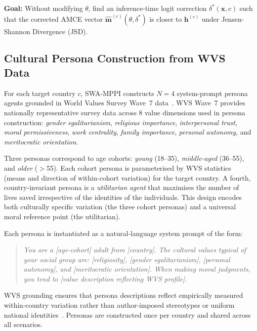 \documentclass{article}
\begin{document}
\textbf{Goal:} Without modifying $\theta$, find an inference-time logit correction
$\delta^*(\mathbf{x}, c)$ such that the corrected AMCE vector
$\hat{\mathbf{m}}^{(c)}(\theta, \delta^*)$ is closer to $\mathbf{h}^{(c)}$
under Jensen-Shannon Divergence (JSD).

\subsection{Cultural Persona Construction from WVS Data}
\label{sec:method:personas}

For each target country $c$, SWA-MPPI constructs $N=4$ system-prompt persona agents
grounded in World Values Survey Wave~7 data~\citep{haerpfer2022wvs}. WVS Wave~7 provides
nationally representative survey data across 8 value dimensions used in persona
construction: \emph{gender egalitarianism}, \emph{religious importance},
\emph{interpersonal trust}, \emph{moral permissiveness}, \emph{work centrality},
\emph{family importance}, \emph{personal autonomy}, and \emph{meritocratic orientation}.

Three personas correspond to age cohorts: \emph{young} (18--35), \emph{middle-aged}
(36--55), and \emph{older} ($>$55). Each cohort persona is parameterised by WVS
statistics (means and direction of within-cohort variation) for the target country.
A fourth, country-invariant persona is a \emph{utilitarian agent} that maximises
the number of lives saved irrespective of the identities of the individuals. This
design encodes both culturally specific variation (the three cohort personas) and a
universal moral reference point (the utilitarian).

Each persona is instantiated as a natural-language system prompt of the form:

\begin{quote}
\small\itshape
You are a [age-cohort] adult from [country]. The cultural values typical of your
social group are: [religiosity], [gender egalitarianism], [personal autonomy], and
[meritocratic orientation]. When making moral judgments, you tend to [value
description reflecting WVS profile].
\end{quote}

\noindent WVS grounding ensures that persona descriptions reflect empirically measured
within-country variation rather than author-imposed stereotypes or uniform national
identities~\citep{deshpande2023toxicity}. Personas are constructed once per country
and shared across all scenarios.
\end{document}
